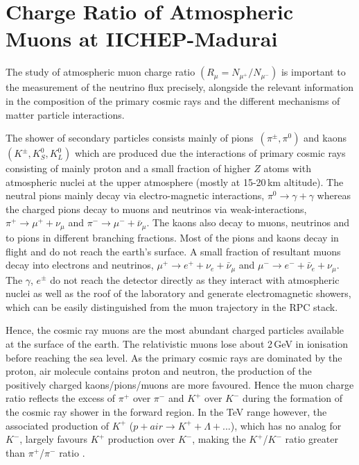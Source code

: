 
\chapter{Charge Ratio of Atmospheric Muons at IICHEP-Madurai}


The study of atmospheric muon charge ratio
$\left(R_{\mu}=N_{\mu^{+}}/N_{\mu^{-}}\right)$
is important to the measurement of the neutrino flux precisely,
alongside the relevant information in the composition of the primary
cosmic rays and the different mechanisms of matter particle
interactions.

The shower of secondary particles consists mainly of
\mbox{pions $\left(\pi^{\pm}, \pi^0\right)$} and
\mbox{kaons $\left(K^{\pm}, K^0_S, K^0_L\right)$} which are produced due
the interactions of primary cosmic rays consisting of mainly proton
and a small fraction of higher $Z$ atoms \cite{cosmic1,pdgspectra1}
with atmospheric nuclei at the upper atmosphere (mostly at 15-20\,km
altitude).
The neutral pions mainly decay via electro-magnetic interactions,
$\pi^0 \rightarrow \gamma+\gamma$ whereas the charged pions decay to
muons and neutrinos via weak-interactions,
$\pi^+ \rightarrow \mu^+ + \nu_{\mu}$ and
$\pi^- \rightarrow \mu^- + \bar{\nu}_{\mu}$. The kaons also decay to
muons, neutrinos and to pions in different branching fractions.
Most of the pions and kaons decay in flight and do not reach the
earth's surface.
A small fraction of resultant muons decay into electrons and neutrinos,
$\mu^+ \rightarrow e^+ + \nu_{e} + \bar{\nu}_{\mu}$ and
$\mu^- \rightarrow e^- + \bar{\nu}_{e} + \nu_{\mu}$.
The $\gamma$, $e^{\pm}$ do not reach the detector directly as they
interact with atmospheric nuclei as well as the roof of the laboratory
and generate electromagnetic showers, which can be easily distinguished
from the muon trajectory in the RPC stack.

Hence, the cosmic ray muons are the most abundant charged particles
available at the surface of the earth. The relativistic muons lose
about 2\,GeV in ionisation before reaching the sea level.
As the primary cosmic rays are dominated by the proton, air molecule
  contains proton and neutron, the production of the positively
  charged kaons/pions/muons are more favoured.
Hence the muon charge ratio reflects the excess of $\pi^{+}$ over
$\pi^{-}$ and $K^{+}$ over $K^{-}$ during the formation of the
cosmic ray shower in the forward region. In the TeV range however,
the associated production of $K^{+}$
($p+air \rightarrow K^{+} + \Lambda + ...$), which has no analog for $K^{-}$,
largely favours $K^{+}$ production over $K^{-}$, making the
$K^{+}$/$K^{-}$ ratio greater than $\pi^{+}$/$\pi^{-}$ ratio
\cite{adamson2007}.

